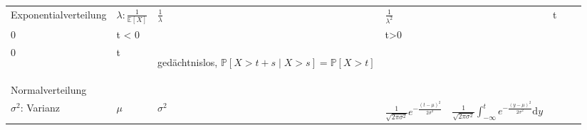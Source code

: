 \documentclass[a4paper,10pt]{article}
\def\P{\mathbb{P}}
\def\E{\mathbb{E}}
\begin{document}
\begin{center}
\begin{tabularx}{\textwidth}{llXXXXXX}
		Exponentialverteilung    & \( \lambda: \frac{1}{\E[X]} \) & \( \frac{1}{\lambda} \)                                                 & \( \frac{1}{\lambda^2} \)                                                                                   & \( \begin{cases} \lambda e^{-\lambda t} & t \geq 0 \\ 0 & t < 0 \end{cases} \)                                                                & \( \begin{cases} 1-e^{-\lambda t} & t>0 \\ 0 & t \leq 0\end{cases}\)                   & \begin{rowlist}
			                                                                                                                                                                                                                                                                                                                                                                                                                                                                                             \item gedächtnislos, $\P[X > t + s \mid X > s] = \P[X > t]$
		                                                                                                                                                                                                                                                                                                                                                                                                                                                                                             \end{rowlist}                                                \\

		Normalverteilung         & \makecell[l]{\( \mu: \E[X] \)                                                                                                                                                                                                                                                                                                                                                                                                                                                                                                                                                            \\ \( \sigma^2 \): Varianz} & \( \mu \) & \( \sigma ^2 \) & \( \frac{1}{\sqrt{2\pi \sigma^2} }e^{-{\frac{(t-\mu)^2}{2\sigma^2} }} \) & \( \frac{1}{ {\sqrt{2\pi \sigma^2}}} \int_{-\infty}^t e^{-\frac{(y-\mu)^2}{2\sigma^2}} \mathrm{d} y \) \\


\end{tabularx}
\end{center}
\end{document}
